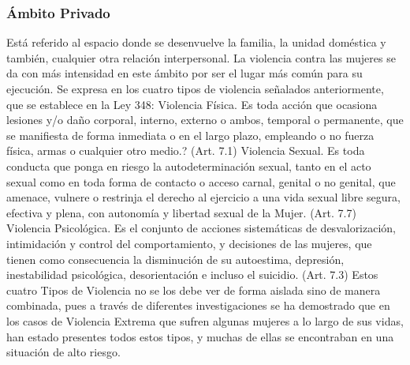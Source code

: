 \subsubsection{Ámbito Privado}
Está referido al espacio donde se desenvuelve la familia, la unidad doméstica y también, cualquier otra relación interpersonal.
La violencia contra las mujeres se da con más intensidad en este ámbito por ser el lugar más común para su ejecución. Se expresa en los cuatro tipos de violencia señalados anteriormente, que se establece en la Ley 348:
Violencia Física. Es toda acción que ocasiona lesiones y/o daño corporal, interno, externo o ambos, temporal o permanente, que se manifiesta de forma inmediata o en el largo plazo, empleando o no fuerza física, armas o
cualquier otro medio.? (Art. 7.1)
Violencia Sexual. Es toda conducta que ponga en riesgo la autodeterminación sexual, tanto en el acto sexual como en toda forma de contacto o acceso carnal, genital o no genital, que amenace, vulnere o restrinja el derecho al ejercicio a una vida sexual libre segura, efectiva y plena, con autonomía y libertad sexual de la Mujer. (Art. 7.7)
Violencia Psicológica. Es el conjunto de acciones sistemáticas de desvalorización, intimidación y control del comportamiento, y decisiones de las mujeres, que tienen como consecuencia la disminución de su autoestima, depresión, inestabilidad psicológica, desorientación e incluso el suicidio. (Art. 7.3) 
Estos cuatro Tipos de Violencia no se los debe ver de forma aislada sino de manera combinada, pues a través de diferentes investigaciones se ha demostrado que en los casos de Violencia Extrema que sufren algunas mujeres a lo largo de sus vidas, han estado presentes todos estos tipos, y muchas de ellas se encontraban en una situación de alto riesgo. 

